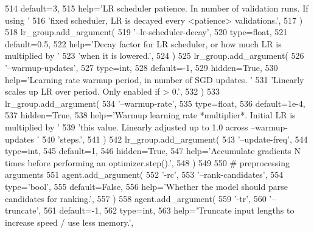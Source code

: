 \begin{DoxyCode}
514             default=3,
515             help=\textcolor{stringliteral}{'LR scheduler patience. In number of validation runs. If using '}
516             \textcolor{stringliteral}{'fixed scheduler, LR is decayed every <patience> validations.'},
517         )
518         lr\_group.add\_argument(
519             \textcolor{stringliteral}{'--lr-scheduler-decay'},
520             type=float,
521             default=0.5,
522             help=\textcolor{stringliteral}{'Decay factor for LR scheduler, or how much LR is multiplied by '}
523             \textcolor{stringliteral}{'when it is lowered.'},
524         )
525         lr\_group.add\_argument(
526             \textcolor{stringliteral}{'--warmup-updates'},
527             type=int,
528             default=-1,
529             hidden=\textcolor{keyword}{True},
530             help=\textcolor{stringliteral}{'Learning rate warmup period, in number of SGD updates. '}
531             \textcolor{stringliteral}{'Linearly scales up LR over period. Only enabled if > 0.'},
532         )
533         lr\_group.add\_argument(
534             \textcolor{stringliteral}{'--warmup-rate'},
535             type=float,
536             default=1e-4,
537             hidden=\textcolor{keyword}{True},
538             help=\textcolor{stringliteral}{'Warmup learning rate *multiplier*. Initial LR is multiplied by '}
539             \textcolor{stringliteral}{'this value. Linearly adjusted up to 1.0 across --warmup-updates '}
540             \textcolor{stringliteral}{'steps.'},
541         )
542         lr\_group.add\_argument(
543             \textcolor{stringliteral}{'--update-freq'},
544             type=int,
545             default=1,
546             hidden=\textcolor{keyword}{True},
547             help=\textcolor{stringliteral}{'Accumulate gradients N times before performing an optimizer.step().'},
548         )
549 
550         \textcolor{comment}{# preprocessing arguments}
551         agent.add\_argument(
552             \textcolor{stringliteral}{'-rc'},
553             \textcolor{stringliteral}{'--rank-candidates'},
554             type=\textcolor{stringliteral}{'bool'},
555             default=\textcolor{keyword}{False},
556             help=\textcolor{stringliteral}{'Whether the model should parse candidates for ranking.'},
557         )
558         agent.add\_argument(
559             \textcolor{stringliteral}{'-tr'},
560             \textcolor{stringliteral}{'--truncate'},
561             default=-1,
562             type=int,
563             help=\textcolor{stringliteral}{'Truncate input lengths to increase speed / use less memory.'},

\end{DoxyCode}

